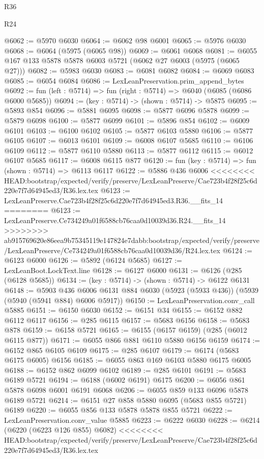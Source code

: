 \begin{lexlean}{R36}
\begin{lexlean}{R24}
\begin{coremodule}
{{{{{{{{{{{{{{{{{{{{{{{{{{{{{{{{{{{{{{{{{{{{{{{{{{{{{{{{{{{{{{{{{{{{{{{{{{{{{{{{{{{{{{{{{{{{{{{{{{{{{{{{{{{{{{{{{{{{{{{{{{{{{{{{{{{{{{{{{{{{{{{{{{{{{{{{{{{{{{{{{{{{{{{{{{{{{{{{{{{{{{{{{{{{{{{{{{{@6062 := @5970 @6030
@6064 := @6062 @98 @6001
@6065 := @5976 @6030
@6068 := @6064 (@5975 (@6065 @98))
@6069 := @6061 @6068
@6081 := @6055 @167 @133 @5878 @5878 @6003 @5721 (@6062 @27 @6003 (@5975 (@6065 @27)))
@6082 := @5983 @6030
@6083 := @6081 @6082
@6084 := @6069 @6083
@6085 := @6054 @6084
@6086 := LexLeanPreservation.prim_append_bytes
@6092 := fun (left : @5714) => fun (right : @5714) => @6040 (@6085 (@6086 @6000 @5685))
@6094 := (key : @5714) -> (shown : @5714) -> @5875
@6095 := @5893 @854
@6096 := @5881 @6095
@6098 := @5877 @6096 @5878
@6099 := @5879 @6098
@6100 := @5877 @6099
@6101 := @5896 @854
@6102 := @6009 @6101
@6103 := @6100 @6102
@6105 := @5877 @6103 @5880
@6106 := @5877 @6105
@6107 := @6013 @6101
@6109 := @6008 @6107 @5685
@6110 := @6106 @6109
@6112 := @5877 @6110 @5880
@6113 := @5877 @6112
@6115 := @6012 @6107 @5685
@6117 := @6008 @6115 @877
@6120 := fun (key : @5714) => fun (shown : @5714) => @6113 @6117
@6122 := @5886 @436 @6006
<<<<<<<< HEAD:bootstrap/expected/verify/preserve/LexLeanPreserve/Cae723b4f28f25c6d220e7f7d64945ed3/R36.lex.tex
@6123 := LexLeanPreserve.Cae723b4f28f25c6d220e7f7d64945ed3.R36.__fits_14
========
@6123 := LexLeanPreserve.Ce734249a01f6588cb76caa0d10039d36.R24.__fits_14
>>>>>>>> ab915769620e86eea9b75345119e147824e7dabb:bootstrap/expected/verify/preserve/LexLeanPreserve/Ce734249a01f6588cb76caa0d10039d36/R24.lex.tex
@6124 := @6123 @6000
@6126 := @5892 (@6124 @5685)
@6127 := LexLeanBoot.LockText.line
@6128 := @6127 @6000
@6131 := @6126 (@285 (@6128 @5685))
@6134 := (key : @5714) -> (shown : @5714) -> @6122 @6131
@6148 := @5903
    @436
    @6006
    @6131
    @884
    @6030
    (@5923 (@5933 @436))
    (@5939 (@5940 (@5941 @884) @6006 @5917))
@6150 := LexLeanPreservation.conv_call @5885
@6151 := @6150 @6030
@6152 := @6151 @34
@6155 := @6152 @882 @6112 @6117
@6156 := @285 @6115
@6157 := @5683 @6156
@6158 := @5683 @878
@6159 := @6158 @5721
@6165 := @6155 (@6157 @6159) (@285 (@6012 @6115 @877))
@6171 := @6055 @866 @881 @6110 @5880 @6156 @6159
@6174 := @6152 @865 @6105 @6109
@6175 := @285 @6107
@6179 := @6174 (@5683 @6175 @6005) @6156
@6185 := @6055 @863 @169 @6103 @5880 @6175 @6005
@6188 := @6152 @862 @6099 @6102
@6189 := @285 @6101
@6191 := @5683 @6189 @5721
@6194 := @6188 (@6002 @6191) @6175
@6200 := @6056 @861 @5878 @6098 @6001 @6191 @6068
@6206 := @6055 @859 @133 @6096 @5878 @6189 @5721
@6214 := @6151 @27 @858 @5880 @6095 (@5683 @855 @5721) @6189
@6220 := @6055 @856 @133 @5878 @5878 @855 @5721
@6222 := LexLeanPreservation.conv_value @5885
@6223 := @6222 @6030
@6228 := @6214 (@6220 (@6223 @126 @855) @6082)
<<<<<<<< HEAD:bootstrap/expected/verify/preserve/LexLeanPreserve/Cae723b4f28f25c6d220e7f7d64945ed3/R36.lex.tex
}}}}}}}}}}}}}}}}}}}}}}}}}}}}}}}}}}}}}}}}}}}}}}}}}}}}}}}}}}}}}}}}}}}}}}}}}}}}}}}}}}}}}}}}}}}}}}}}}}}}}}}}}}}}}}}}}}}}}}}}}}}}}}}}}}}}}}}}}}}}}}}}}}}}}}}}}}}}}}}}}}}}}}}}}}}}}}}}}}}}}}}}}}}}}}}}}}}
\end{coremodule}
\end{lexlean}
\end{lexlean}
